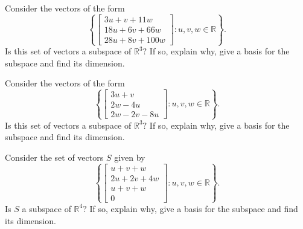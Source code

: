 \documentclass{ximera}
\begin{document}
\begin{problem}\label{prb:5.20} Consider the vectors of the form
\begin{equation*}
\left\{ \left[
\begin{array}{c}
3u+v+11w \\
18u+6v+66w \\
28u+8v+100w
\end{array}
\right] :u,v,w\in \mathbb{R}\right\} .
\end{equation*}
Is this set of vectors a subspace of $\mathbb{R}^{3}?$ If so, explain why,
give a basis for the subspace and find its dimension.
\end{problem}

\begin{problem}\label{prb:5.21} Consider the vectors of the form
\begin{equation*}
\left\{ \left[
\begin{array}{c}
3u+v \\
2w-4u \\
2w-2v-8u
\end{array}
\right] :u,v,w\in \mathbb{R}\right\} .
\end{equation*}
Is this set of vectors a subspace of $\mathbb{R}^{3}?$ If so, explain why,
give a basis for the subspace and find its dimension.
\end{problem}

\begin{problem}\label{prb:5.22} Consider the set of vectors $S$ given by
\begin{equation*}
\left\{ \left[
\begin{array}{c}
u+v+w \\
2u+2v+4w \\
u+v+w \\
0
\end{array}
\right] :u,v,w\in \mathbb{R}\right\} .
\end{equation*}
Is $S$ a subspace of $\mathbb{R}^{4}?$ If so, explain why,
give a basis for the subspace and find its dimension.
\end{problem}
\end{document}
